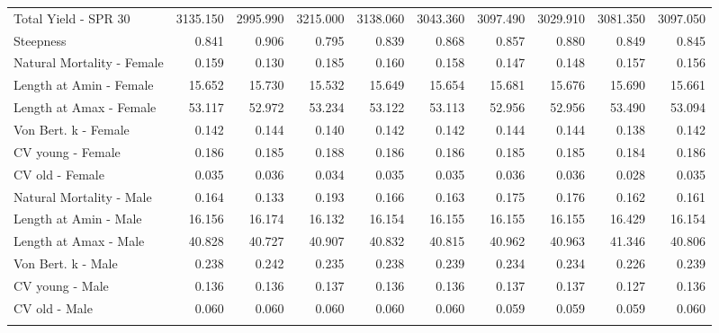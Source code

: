 \documentclass[12pt,]{article}
\begin{document}
\begin{landscape}
\begin{longtable}{lrrrrrrrrr}
  Total Yield - SPR 30 & 3135.150 & 2995.990 & 3215.000 & 3138.060 & 3043.360 & 3097.490 & 3029.910 & 3081.350 & 3097.050 \\ 
  Steepness & 0.841 & 0.906 & 0.795 & 0.839 & 0.868 & 0.857 & 0.880 & 0.849 & 0.845 \\ 
  Natural Mortality - Female & 0.159 & 0.130 & 0.185 & 0.160 & 0.158 & 0.147 & 0.148 & 0.157 & 0.156 \\ 
  Length at Amin - Female & 15.652 & 15.730 & 15.532 & 15.649 & 15.654 & 15.681 & 15.676 & 15.690 & 15.661 \\ 
  Length at Amax - Female & 53.117 & 52.972 & 53.234 & 53.122 & 53.113 & 52.956 & 52.956 & 53.490 & 53.094 \\ 
  Von Bert. k - Female & 0.142 & 0.144 & 0.140 & 0.142 & 0.142 & 0.144 & 0.144 & 0.138 & 0.142 \\ 
  CV young - Female & 0.186 & 0.185 & 0.188 & 0.186 & 0.186 & 0.185 & 0.185 & 0.184 & 0.186 \\ 
  CV old - Female & 0.035 & 0.036 & 0.034 & 0.035 & 0.035 & 0.036 & 0.036 & 0.028 & 0.035 \\ 
  Natural Mortality - Male & 0.164 & 0.133 & 0.193 & 0.166 & 0.163 & 0.175 & 0.176 & 0.162 & 0.161 \\ 
  Length at Amin - Male & 16.156 & 16.174 & 16.132 & 16.154 & 16.155 & 16.155 & 16.155 & 16.429 & 16.154 \\ 
  Length at Amax - Male & 40.828 & 40.727 & 40.907 & 40.832 & 40.815 & 40.962 & 40.963 & 41.346 & 40.806 \\ 
  Von Bert. k - Male & 0.238 & 0.242 & 0.235 & 0.238 & 0.239 & 0.234 & 0.234 & 0.226 & 0.239 \\ 
  CV young - Male & 0.136 & 0.136 & 0.137 & 0.136 & 0.136 & 0.137 & 0.137 & 0.127 & 0.136 \\ 
  CV old - Male & 0.060 & 0.060 & 0.060 & 0.060 & 0.060 & 0.059 & 0.059 & 0.059 & 0.060 \\ 
   \hline
\hline
\label{tab:sens_table}
\end{longtable}
\endgroup
\end{landscape}

\newpage

\FloatBarrier 

\newpage
\end{document}
